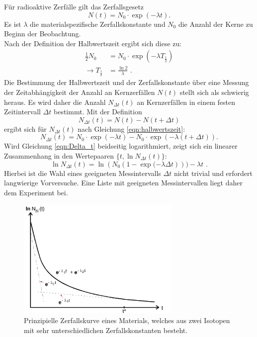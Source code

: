 Für radioaktive Zerfälle gilt das Zerfallsgesetz
\begin{equation}
  N(t)=N_0 \cdot \exp{(-\lambda t)} \text{.}
\end{equation}
Es ist $\lambda$ die materialspezifische Zerfallskonstante und $N_0$ die Anzahl der Kerne zu Beginn der Beobachtung.\\
Nach der Definition der Halbwertszeit ergibt sich diese zu:
\begin{align}
  \label{eqn:halbwertszeit}
  \frac{1}{2} N_0&= N_0 \cdot \exp{(-\lambda T_\frac{1}{2})}\\
  \rightarrow T_{\frac{1}{2}}&=\frac{\ln{2}}{\lambda} \text{ .}
\end{align}
Die Bestimmung der Halbwertszeit und der Zerfallskonstante über eine Messung der Zeitabhängigkeit der Anzahl an Kernzerfällen $N(t)$ stellt sich als schwierig heraus.
Es wird daher die Anzahl $N_{\Delta t}(t)$ an Kernzerfällen in einem festen Zeitintervall $\Delta t$ bestimmt.
Mit der Definition
\begin{equation*}
  N_{\Delta t}(t)=N(t)-N(t+\Delta t)
\end{equation*}
ergibt sich für $N_{\Delta t}(t)$ nach Gleichung \eqref{eqn:halbwertszeit}:
\begin{equation}
  \label{eqn:Delta_t}
  N_{\Delta t}(t)=N_0 \cdot \exp{(-\lambda t)}-N_0 \cdot \exp{(-\lambda(t+\Delta t))} \text{.}
\end{equation}
Wird Gleichung \eqref{eqn:Delta_t} beidseitig logarithmiert, zeigt sich ein linearer Zusammenhang in den Wertepaaren $\{t, \ln{N_{\Delta t}(t)}\}$:
\begin{equation}
  \label{eqn:ausgleichsrechnung}
  \ln{  N_{\Delta t}(t)}=\ln{(N_0 \left(1- \exp{(-\lambda \Delta t}\right)))}-\lambda t \text{ .}
\end{equation}
Hierbei ist die Wahl eines geeigneten Messintervalls $\Delta t$ nicht trivial und erfordert langwierige Vorversuche. Eine Liste mit geeigneten Messintervallen liegt daher dem Experiment bei.
\begin{figure}
  \centering
  \includegraphics[width=0.7\textwidth]{Bilder/zerfallskurve.png}
  \caption{Prinzipielle Zerfallskurve eines Materials, welches aus zwei Isotopen mit sehr unterschiedlichen Zerfallskonstanten besteht. \cite{Anleitung}}
  \label{fig:zerfallskurve}
\end{figure}


